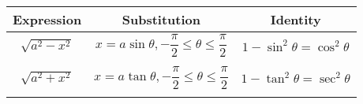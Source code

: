 \documentclass[
  landscape,  
  10pt,
]{article}
\begin{document}
\begin{longtable}[]{@{}ccc@{}}
\toprule
\begin{minipage}[b]{0.30\columnwidth}\centering
Expression\strut
\end{minipage} & \begin{minipage}[b]{0.30\columnwidth}\centering
Substitution\strut
\end{minipage} & \begin{minipage}[b]{0.30\columnwidth}\centering
Identity\strut
\end{minipage}\tabularnewline
\midrule
\endhead
\begin{minipage}[t]{0.30\columnwidth}\centering
\(\sqrt{a^2-x^2}\)\strut
\end{minipage} & \begin{minipage}[t]{0.30\columnwidth}\centering
\(x = a\sin \theta, -\dfrac{\pi}{2} \leq \theta \leq \dfrac{\pi}{2}\)\strut
\end{minipage} & \begin{minipage}[t]{0.30\columnwidth}\centering
\(1 - \sin^2 \theta = \cos^2 \theta\)\strut
\end{minipage}\tabularnewline
\begin{minipage}[t]{0.30\columnwidth}\centering
\strut
\end{minipage} & \begin{minipage}[t]{0.30\columnwidth}\centering
\strut
\end{minipage} & \begin{minipage}[t]{0.30\columnwidth}\centering
\strut
\end{minipage}\tabularnewline
\begin{minipage}[t]{0.30\columnwidth}\centering
\(\sqrt{a^2+x^2}\)\strut
\end{minipage} & \begin{minipage}[t]{0.30\columnwidth}\centering
\(x = a\tan \theta, -\dfrac{\pi}{2} \leq \theta \leq \dfrac{\pi}{2}\)\strut
\end{minipage} & \begin{minipage}[t]{0.30\columnwidth}\centering
\(1 - \tan^2 \theta = \sec^2 \theta\)\strut
\end{minipage}\tabularnewline
\begin{minipage}[t]{0.30\columnwidth}\centering
\strut
\end{minipage} & \begin{minipage}[t]{0.30\columnwidth}\centering
\strut
\end{minipage} & \begin{minipage}[t]{0.30\columnwidth}\centering

\end{minipage}
\end{longtable}
\end{document}
